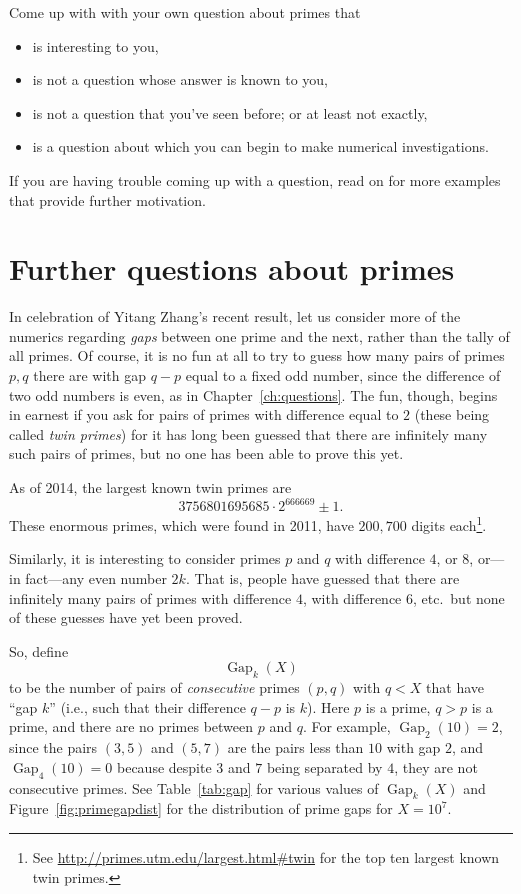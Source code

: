 \documentclass[openany]{book}
\DeclareMathOperator{\Gap}{Gap}
\theoremstyle{plain}
\theoremstyle{definition}
\begin{document}
Come up with with your own question about primes that
 \begin{itemize}
 \item     is interesting to you,
  \item    is not a question whose answer is known to you,
 \item     is not a question that you've seen before; or at least not exactly,
  \item    is a question about which you can begin to make numerical investigations.
 \end{itemize}
If you are having trouble coming up with a question, read on for more
examples that  provide further motivation.

\chapter{Further questions about primes\label{ch:further}}

In celebration of Yitang Zhang's recent result, let us consider more of the numerics
regarding {\em gaps} between one prime and the next, rather than the tally
of all primes. Of course, it is no fun at all to try to guess how many
pairs of primes $p, q$ there are with gap $q-p$ equal to a fixed odd
number, since the difference of two odd numbers is even, as
in Chapter~\ref{ch:questions}.  The fun,
though, begins in earnest if you ask for pairs of primes with
difference equal to $2$ (these being called {\em twin primes}) for it
has long been guessed that there are infinitely many such pairs of
primes, but no one has been able to prove this yet.

As of 2014, the largest known twin primes are
$$3756801695685\cdot 2^{666669} \pm 1.$$
These enormous primes, which were found in 2011, have $200{,}700$ digits each\footnote{See \url{http://primes.utm.edu/largest.html\#twin} for the top ten
largest known twin primes.}.


Similarly, it is interesting to consider primes $p$ and $q$
with difference $4$, or $8$, or---in fact---any even number
$2k$. That is, people have guessed that there are infinitely many
pairs of primes with difference $4$, with difference $6$, etc.\ but
none of these guesses have yet been proved.





So, define
$$
  \Gap_{k}(X)
$$
to be the number of pairs of {\em consecutive} primes $(p,q)$ with
$q<X$ that have ``gap $k$'' (i.e., such that their difference $q-p$ is
$k$).  Here $p$ is a prime, $q>p$ is a prime, and there are no primes
between $p$ and $q$.  For example, $\Gap_2(10) = 2$, since the pairs
$(3,5)$ and $(5,7)$ are the pairs less than $10$ with gap $2$,
and $\Gap_{4}(10)=0$ because despite $3$ and $7$ being separated
by $4$, they are not consecutive primes.
See Table~\ref{tab:gap} for various values of $\Gap_{k}(X)$ and
Figure~\ref{fig:primegapdist} for the distribution of prime gaps for
$X=10^7$.
\end{document}
